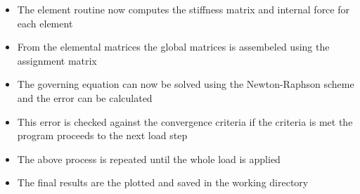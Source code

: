 \documentclass[a4paper,12pt]{article}
\begin{document}
\begin{itemize}
\item The element routine now computes the stiffness matrix and internal force for each element 
\item From the elemental matrices the global matrices is assembeled using the assignment matrix
\item The governing equation can now be solved using the Newton-Raphson scheme and the error can be calculated
\item This error is checked against the convergence criteria if the criteria is met the program proceeds to the next load step
\item The above process is repeated until the whole load is applied 
\item The final results are the plotted and saved in the working directory
\end{itemize}
\end{document}
